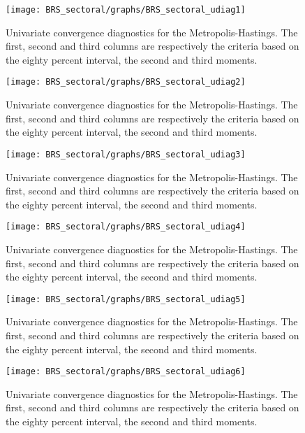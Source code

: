  
\begin{figure}[H]
\centering 
\texttt{[image: BRS\_sectoral/graphs/BRS\_sectoral\_udiag1]}
\caption{Univariate convergence diagnostics for the Metropolis-Hastings.
The first, second and third columns are respectively the criteria based on
the eighty percent interval, the second and third moments.}\label{Fig:UnivariateDiagnostics:1}
\end{figure}

\begin{figure}[H]
\centering 
\texttt{[image: BRS\_sectoral/graphs/BRS\_sectoral\_udiag2]}
\caption{Univariate convergence diagnostics for the Metropolis-Hastings.
The first, second and third columns are respectively the criteria based on
the eighty percent interval, the second and third moments.}\label{Fig:UnivariateDiagnostics:2}
\end{figure}

\begin{figure}[H]
\centering 
\texttt{[image: BRS\_sectoral/graphs/BRS\_sectoral\_udiag3]}
\caption{Univariate convergence diagnostics for the Metropolis-Hastings.
The first, second and third columns are respectively the criteria based on
the eighty percent interval, the second and third moments.}\label{Fig:UnivariateDiagnostics:3}
\end{figure}

\begin{figure}[H]
\centering 
\texttt{[image: BRS\_sectoral/graphs/BRS\_sectoral\_udiag4]}
\caption{Univariate convergence diagnostics for the Metropolis-Hastings.
The first, second and third columns are respectively the criteria based on
the eighty percent interval, the second and third moments.}\label{Fig:UnivariateDiagnostics:4}
\end{figure}

\begin{figure}[H]
\centering 
\texttt{[image: BRS\_sectoral/graphs/BRS\_sectoral\_udiag5]}
\caption{Univariate convergence diagnostics for the Metropolis-Hastings.
The first, second and third columns are respectively the criteria based on
the eighty percent interval, the second and third moments.}\label{Fig:UnivariateDiagnostics:5}
\end{figure}

\begin{figure}[H]
\centering 
\texttt{[image: BRS\_sectoral/graphs/BRS\_sectoral\_udiag6]}
\caption{Univariate convergence diagnostics for the Metropolis-Hastings.
The first, second and third columns are respectively the criteria based on
the eighty percent interval, the second and third moments.}\label{Fig:UnivariateDiagnostics:6}
\end{figure}

